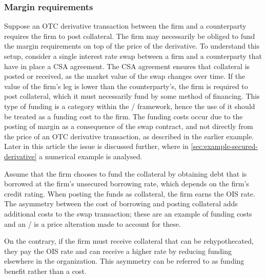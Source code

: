 \documentclass[main.tex]{subfiles}
\begin{document}
        \subsubsection*{Margin requirements}
            Suppose an OTC derivative transaction between the firm and a counterparty requires the firm to post collateral.
            The firm may necessarily be obliged to fund the margin requirements on top of the price of the derivative.
            To understand this setup,
            consider a single interest rate swap between a firm and a counterparty that have in place a CSA agreement.
            The CSA agreement ensures that collateral is posted or received,
            as the market value of the swap changes over time.
            If the value of the firm's leg is lower than the counterparty's,
            the firm is required to post collateral, 
            which it must necessarily fund by some method of financing.
            This type of funding is a category within the \FVA/ framework, 
            hence the use of it should be treated as a funding cost to the firm.
            The funding costs occur due to the posting of margin as a consequence of the swap contract,
            and not directly from the price of an OTC derivative transaction,
            as described in the earlier example.
            Later in this article the issue is discussed further, 
            where in \cref{sec:example-secured-derivative} a numerical example is analysed.
            
            Assume that the firm chooses to fund the collateral by obtaining debt
            that is borrowed at the firm's unsecured borrowing rate, which depends on the firm's credit rating.
            When posting the funds as collateral, the firm earns the OIS rate.
            The asymmetry between the cost of borrowing and posting collateral
            adds additional costs to the swap transaction; 
            these are an example of funding costs and an \FVA/ is a price alteration made to account for these.

            On the contrary, if the firm must receive collateral that can be rehypothecated,
            they pay the OIS rate and can receive a higher rate
            by reducing funding elsewhere in the organization.
            This asymmetry can be referred to as funding benefit rather than a cost.
\end{document}

